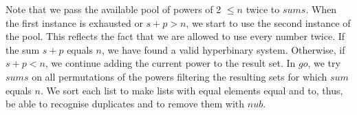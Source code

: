 \documentclass[tikz]{scrreprt}
\newcommand{\Varid}[1]{\mathit{#1}}
\begin{document}
Note that we pass the available pool of powers of 2 $\le n$
twice to \ensuremath{\Varid{sums}}. When the first instance is exhausted or
$s + p > n$, we start to use the second instance of the pool.
This reflects the fact that we are allowed to use every number
twice.
If the sum $s+p$ equals $n$, we have found a valid
hyperbinary system.
Otherwise, if $s+p < n$, we continue adding the current power
to the result set.
In \ensuremath{\Varid{go}}, we try \ensuremath{\Varid{sums}} on all permutations of the powers
filtering the resulting sets for which \ensuremath{\Varid{sum}} equals $n$.
We sort each list to make lists with equal elements equal 
and to, thus, be able to recognise duplicates and
to remove them with \ensuremath{\Varid{nub}}.
\end{document}
